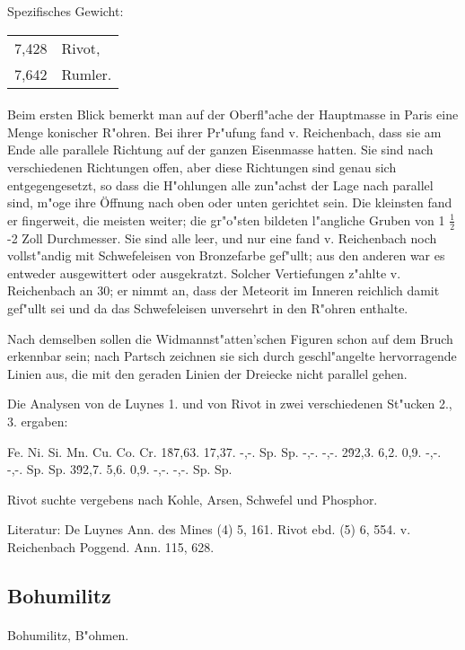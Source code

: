 \documentclass[a4paper, 11pt, oneside]{article}
\begin{document}
Spezifisches Gewicht:  
\begin{table}[!ht]
    \centering
    \begin{tabular}{l l}
        7,428 & Rivot,\\
        7,642 & Rumler.
    \end{tabular}
\end{table}
\paragraph{}
Beim ersten Blick bemerkt man auf der Oberfl"ache der Hauptmasse in Paris eine Menge konischer R"ohren. Bei ihrer Pr"ufung fand v. Reichenbach, dass sie am Ende alle parallele Richtung auf der ganzen Eisenmasse hatten. Sie sind nach verschiedenen Richtungen offen, aber diese Richtungen sind genau sich entgegengesetzt, so dass die H"ohlungen alle zun"achst der Lage nach parallel sind, m"oge ihre Öffnung nach oben oder unten gerichtet sein. Die kleinsten fand er fingerweit, die meisten weiter; die gr"o"sten bildeten l"angliche Gruben von 1 $\frac{1}{2}$-2 Zoll Durchmesser. Sie sind alle leer, und nur eine fand v. Reichenbach noch vollst"andig mit Schwefeleisen von Bronzefarbe gef"ullt; aus den anderen war es entweder ausgewittert oder ausgekratzt. Solcher Vertiefungen z"ahlte v. Reichenbach an 30; er nimmt an, dass der Meteorit im Inneren reichlich damit gef"ullt sei und da das Schwefeleisen unversehrt in den R"ohren enthalte.

Nach demselben sollen die Widmannst"atten'schen Figuren schon auf dem Bruch erkennbar sein; nach Partsch zeichnen sie sich durch geschl"angelte hervorragende Linien aus, die mit den geraden Linien der Dreiecke nicht parallel gehen.

Die Analysen von de Luynes 1. und von Rivot in zwei verschiedenen St"ucken 2., 3. ergaben:

Fe. Ni. Si. Mn. Cu. Co. Cr.  
1\. 87,63. 17,37. -,-. Sp. Sp. -,-. -,-.  
2\. 92,3. 6,2. 0,9. -,-. -,-. Sp. Sp.  
3\. 92,7. 5,6. 0,9. -,-. -,-. Sp. Sp.

Rivot suchte vergebens nach Kohle, Arsen, Schwefel und Phosphor.

Literatur: De Luynes Ann. des Mines (4) 5, 161. Rivot ebd. (5) 6, 554. v. Reichenbach Poggend. Ann. 115, 628.

\subsection{Bohumilitz}
\normalsize
\paragraph{}
Bohumilitz, B"ohmen.
\end{document}
